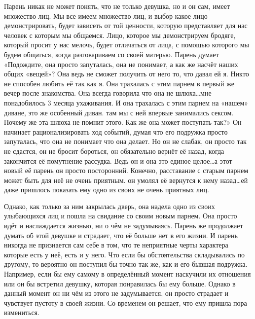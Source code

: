 Парень никак не может понять, что не только девушка, но и он сам, имеет множество лиц. Мы все имеем множество лиц, и выбор какое лицо демонстрировать, будет зависеть от той ценности, которую представляет для нас человек с которым мы общаемся. Лицо, которое мы демонстрируем бродяге, который просит у нас мелочь, будет отличаться от лица, с помощью которого мы будем общаться, когда разговариваем со своей матерью. Парень думает «Подождите, она просто запуталась, она не понимает, а как же насчёт наших общих «вещей»? Она ведь не сможет получить от него то, что давал ей я. Никто не способен любить её так как я. Она трахалась с этим парнем в первый же вечер после знакомства. Она всегда говорила что она не шлюха\ldots мне понадобилось 3 месяца ухаживания. И она трахалась с этим парнем на «нашем» диване, это же особенный диван. там мы с ней впервые занимались сексом. Почему же эта шлюха не помнит этого. Как же она может поступать так?» Он начинает рационализировать ход событий, думая что его подружка просто запуталась, что она не понимает что она делает. Но он не слабак, он просто так не сдастся, он не бросит бороться, он обязательно вернёт её назад, когда закончится её помутнение рассудка. Ведь он и она это единое целое\ldots а этот новый её парень он просто посторонний. Конечно, расставание с старым парнем может быть для неё не очень приятным. он умолял её вернутся к нему назад\ldots ей даже пришлось показать ему одно из своих не очень приятных лиц.

Однако, как только за ним закрылась дверь, она надела одно из своих улыбающихся лиц и пошла на свидание со своим новым парнем. Она просто идёт и наслаждается жизнью, ни о чём не задумываясь. Парень же продолжает думать об этой девушке и страдает, что её больше нет в его жизни. И парень никогда не признается сам себе в том, что те неприятные черты характера которые есть у неё, есть и у него. Что если бы обстоятельства складывались по другому, то вероятно он поступил бы точно так же, как и его бывшая подружка. Например, если бы ему самому в определённый момент наскучили их отношения или он бы встретил девушку, которая понравилась бы ему больше. Однако в данный момент он ни чём из этого не задумывается, он просто страдает и чувствует пустоту в своей жизни. Со временем он решает, что ему пришла пора измениться.

